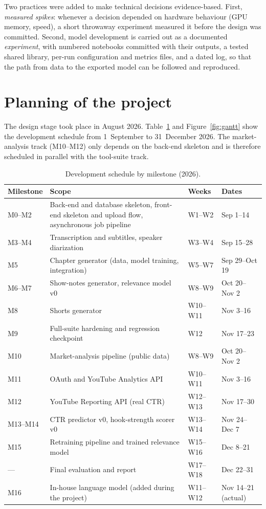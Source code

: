 \documentclass[ENG]{TFUOC}
\begin{document}
Two practices were added to make technical decisions evidence-based. First, \textit{measured spikes}: whenever a decision depended on hardware behaviour (GPU memory, speed), a short throwaway experiment measured it before the design was committed. Second, model development is carried out as a documented \textit{experiment}, with numbered notebooks committed with their outputs, a tested shared library, per-run configuration and metrics files, and a dated log, so that the path from data to the exported model can be followed and reproduced.

\section{Planning of the project}
\label{s:planning}

The design stage took place in August 2026. Table~\ref{tab:planning} and Figure~\ref{fig:gantt} show the development schedule from 1~September to 31~December 2026. The market-analysis track (M10--M12) only depends on the back-end skeleton and is therefore scheduled in parallel with the tool-suite track.

\begin{table}[H]
\centering
\caption{Development schedule by milestone (2026).}
\label{tab:planning}
\small
\begin{tabular}{@{}lp{7.2cm}ll@{}}
\toprule
\textbf{Milestone} & \textbf{Scope} & \textbf{Weeks} & \textbf{Dates} \\
\midrule
M0--M2 & Back-end and database skeleton, front-end skeleton and upload flow, asynchronous job pipeline & W1--W2 & Sep 1--14 \\
M3--M4 & Transcription and subtitles, speaker diarization & W3--W4 & Sep 15--28 \\
M5 & Chapter generator (data, model training, integration) & W5--W7 & Sep 29--Oct 19 \\
M6--M7 & Show-notes generator, relevance model v0 & W8--W9 & Oct 20--Nov 2 \\
M8 & Shorts generator & W10--W11 & Nov 3--16 \\
M9 & Full-suite hardening and regression checkpoint & W12 & Nov 17--23 \\
M10 & Market-analysis pipeline (public data) & W8--W9 & Oct 20--Nov 2 \\
M11 & OAuth and YouTube Analytics API & W10--W11 & Nov 3--16 \\
M12 & YouTube Reporting API (real CTR) & W12--W13 & Nov 17--30 \\
M13--M14 & CTR predictor v0, hook-strength scorer v0 & W13--W14 & Nov 24--Dec 7 \\
M15 & Retraining pipeline and trained relevance model & W15--W16 & Dec 8--21 \\
--- & Final evaluation and report & W17--W18 & Dec 22--31 \\
\midrule
M16 & In-house language model (added during the project) & W11--W12 & Nov 14--21 (actual) \\
\bottomrule
\end{tabular}
\end{table}
\end{document}
